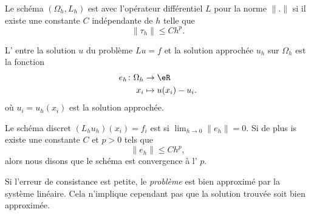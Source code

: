 \begin{definition}
    Le schéma \( (\Omega_h,L_h)\) est  avec l'opérateur différentiel \( L\) pour la norme \( \| . \|\) si il existe une constante \( C\) indépendante de \( h\) telle que
    \begin{equation}
        \| \tau_h \|\leq Ch^p.
    \end{equation}
\end{definition}

\begin{definition}
    L' entre la solution \( u\) du problème \( Lu=f\) et la solution approchée \( u_h\) sur \( \Omega_h\) est la fonction 
    \begin{equation}
        \begin{aligned}
            e_h\colon \Omega_h&\to \eR \\
            x_i&\mapsto u(x_i)-u_i. 
        \end{aligned}
    \end{equation}
    où \( u_i=u_h(x_i)\) est la solution approchée.

    Le schéma discret \( (L_hu_h)(x_i)=f_i\) est  si \( \lim_{h\to 0} \| e_h \|=0\). Si de plus is existe une constante \( C\) et \( p>0\) tels que
    \begin{equation}
        \| e_h \|\leq Ch^p,
    \end{equation}
    alors nous disons que le schéma est convergence à l' \( p\).
\end{definition}

Si l'erreur de consistance est petite, le \emph{problème} est bien approximé par la système linéaire. Cela n'implique cependant pas que la solution trouvée soit bien approximée.

